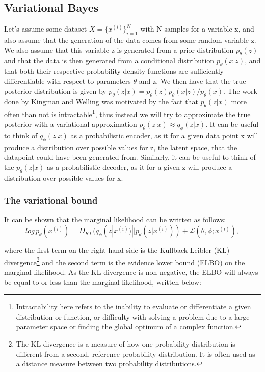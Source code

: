 \subsection*{Variational Bayes}
Let's assume some dataset $X = \{x^{(i)}\}_{i=1}^{N}$ with N samples for a variable x, and also assume that the generation of the data comes from 
some random variable z. We also assume that this variable z is generated from a prior distribution $p_{\theta}(z)$ and that the data is then 
generated from a conditional distribution $p_{\theta}(x|z)$, and that both their respective probability density functions are sufficiently 
differentiable with respect to parameters $\theta$ and z. We then have that the true posterior distribution is given by 
$p_{\theta}(z|x) = p_{\theta}(z)p_{\theta}(x|z)/p_{\theta}(x)$. The work done by Kingman and Welling \cite{VAE} was motivated by the fact that
$p_{\theta}(z|x)$ more often than not is intractable\footnote{Intractability here refers to the inability to evaluate or differentiate 
a given distribution or function, or difficulty with solving a problem due to a large parameter space or finding the global optimum of 
a complex function. }, thus instead we will try to approximate the true posterior with a variational approximation $p_{\theta}(z|x) \approx q_{\phi}(z|x)$.   
 It can be useful to think of $q_{\phi}(z|x)$ as a probabilistic encoder, as it for a given data point x will produce a distribution
over possible values for z, the latent space, that the datapoint could have been generated from. Similarly, it can be useful to think of the   
$p_{\theta}(z|x)$ as a probabilistic decoder, as it for a given z will produce a distribution over possible values for x.

\subsubsection*{The variational bound}
It can be shown that the marginal likelihood can be written as follows:
\begin{equation}
    log\, p_{\theta}(x^{(i)}) = D_{KL}(q_{\phi}(z|x^{(i)})||p_{\theta}(z|x^{(i)})) + \mathcal{L}(\theta, \phi;x^{(i)}),
\end{equation}

where the first term on the right-hand side is the Kullback-Leibler (KL) divergence\footnote{The KL divergence is a measure of how one 
probability distribution is different from a second, reference probability distribution. It is often used as a distance measure 
between two probability distributions.} and the second term is the evidence lower bound (ELBO) on the marginal likelihood. 
As the KL divergence is non-negative, the ELBO will always be equal to or less than the marginal likelihood, written below:

